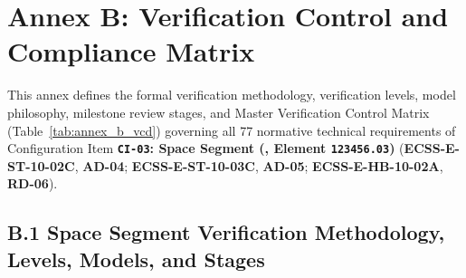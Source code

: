 \section{Annex B: Verification Control and Compliance Matrix}

This annex defines the formal verification methodology, verification levels, model philosophy, milestone review stages, and Master Verification Control Matrix (Table~\ref{tab:annex_b_vcd}) governing all 77 normative technical requirements of Configuration Item \textbf{\texttt{CI-03}: Space Segment (,  Element \texttt{123456.03})} (\textbf{ECSS-E-ST-10-02C}, \textbf{AD-04}; \textbf{ECSS-E-ST-10-03C}, \textbf{AD-05}; \textbf{ECSS-E-HB-10-02A}, \textbf{RD-06}).

\subsection{B.1 Space Segment Verification Methodology, Levels, Models, and Stages}

